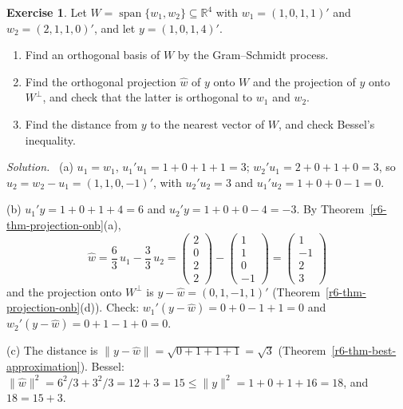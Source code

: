 \documentclass[12pt]{article}
\newcommand{\R}{\mathbb R}
\DeclareMathOperator{\Span}{span}
\theoremstyle{definition}
\newtheorem{exercise}{Exercise}
\newenvironment{solution}{\par\noindent\textit{Solution.}\ }{\par\smallskip}
\begin{document}
\begin{exercise}\label{r6-dr-projection-basis}
Let \(W=\Span\{w_1,w_2\}\subseteq\R^4\) with \(w_1=(1,0,1,1)'\) and \(w_2=(2,1,1,0)'\), and let \(y=(1,0,1,4)'\).
\begin{enumerate}
\item Find an orthogonal basis of \(W\) by the Gram--Schmidt process.
\item Find the orthogonal projection \(\hat w\) of \(y\) onto \(W\) and the projection of \(y\) onto \(W^\perp\), and
check that the latter is orthogonal to \(w_1\) and \(w_2\).
\item Find the distance from \(y\) to the nearest vector of \(W\), and check Bessel's inequality.
\end{enumerate}
\end{exercise}
\begin{solution}
(a) \(u_1=w_1\), \(u_1'u_1=1+0+1+1=3\); \(w_2'u_1=2+0+1+0=3\), so \(u_2=w_2-u_1=(1,1,0,-1)'\), with
\(u_2'u_2=3\) and \(u_1'u_2=1+0+0-1=0\).

(b) \(u_1'y=1+0+1+4=6\) and \(u_2'y=1+0+0-4=-3\). By Theorem~\ref{r6-thm-projection-onb}(a),
\[
\hat w=\frac63\,u_1-\frac33\,u_2=\begin{pmatrix}2\\0\\2\\2\end{pmatrix}-\begin{pmatrix}1\\1\\0\\-1\end{pmatrix}
=\begin{pmatrix}1\\-1\\2\\3\end{pmatrix}
\]
and the projection onto \(W^\perp\) is \(y-\hat w=(0,1,-1,1)'\) (Theorem~\ref{r6-thm-projection-onb}(d)). Check:
\(w_1'(y-\hat w)=0+0-1+1=0\) and \(w_2'(y-\hat w)=0+1-1+0=0\).

(c) The distance is \(\lVert y-\hat w\rVert=\sqrt{0+1+1+1}=\sqrt3\) (Theorem~\ref{r6-thm-best-approximation}).
Bessel: \(\lVert\hat w\rVert^2=6^2/3+3^2/3=12+3=15\leqslant\lVert y\rVert^2=1+0+1+16=18\), and \(18=15+3\).
\end{solution}
\end{document}
